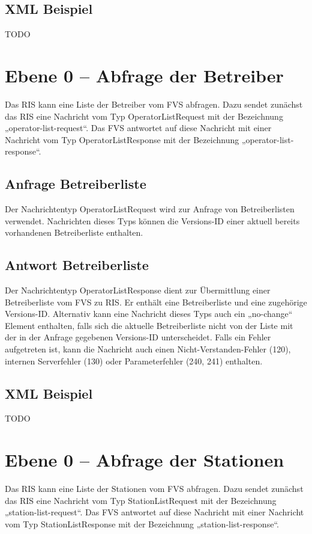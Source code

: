 \subsection{XML Beispiel}
TODO

\section{Ebene 0 -- Abfrage der Betreiber}
Das RIS kann eine Liste der Betreiber vom FVS abfragen. Dazu sendet zunächst das RIS eine Nachricht vom Typ OperatorListRequest mit der Bezeichnung „operator-list-request“. Das FVS antwortet auf diese Nachricht mit einer Nachricht vom Typ OperatorListResponse mit der Bezeichnung „operator-list-response“.



\subsection{Anfrage Betreiberliste}
Der Nachrichtentyp OperatorListRequest wird zur Anfrage von Betreiberlisten verwendet. Nachrichten dieses Typs können die Versions-ID einer aktuell bereits vorhandenen Betreiberliste enthalten.



\subsection{Antwort Betreiberliste}
Der Nachrichtentyp OperatorListResponse dient zur Übermittlung einer Betreiberliste vom FVS zu RIS. Er enthält eine Betreiberliste und eine zugehörige Versions-ID. Alternativ kann eine Nachricht dieses Typs auch ein „no-change“ Element enthalten, falls sich die aktuelle Betreiberliste nicht von der Liste mit der in der Anfrage gegebenen Versions-ID  unterscheidet. Falls ein Fehler aufgetreten ist, kann die Nachricht auch einen Nicht-Verstanden-Fehler (120), internen Serverfehler (130) oder Parameterfehler (240, 241) enthalten.



\subsection{XML Beispiel}
TODO

\section{Ebene 0 -- Abfrage der Stationen}
Das RIS kann eine Liste der Stationen vom FVS abfragen. Dazu sendet zunächst das RIS eine Nachricht vom Typ StationListRequest mit der Bezeichnung „station-list-request“. Das FVS antwortet auf diese Nachricht mit einer Nachricht vom Typ StationListResponse mit der Bezeichnung „station-list-response“.

